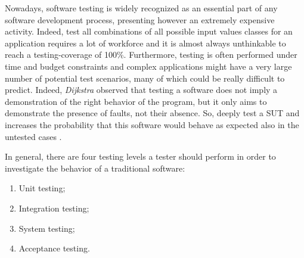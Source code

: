 Nowadays, software testing is widely recognized as an essential part of any software development process, presenting however an extremely expensive activity. Indeed, test all combinations of all possible input values classes for an application \cite{glinz} requires a lot of workforce and it is almost always unthinkable to reach a testing-coverage of 100\%. 
Furthermore, testing is often performed under time and budget constraints \cite{grano} and complex applications might have a very large number of potential test scenarios, many of which could be really difficult to predict. Indeed, \textit{Dijkstra} \cite{dijkstra} observed that testing a software does not imply a demonstration of the right behavior of the program, but it only aims to demonstrate the presence of faults, not their absence. 
So, deeply test a SUT and increases the probability that this software would behave as expected also in the untested cases \cite{glinz}. 

In general, there are four testing levels a tester should perform in order to investigate the behavior of a traditional software: 
\begin{enumerate}
\item Unit testing; 
\item Integration testing; 
\item System testing; 
\item Acceptance testing.
\end{enumerate}

